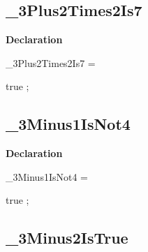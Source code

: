 \documentclass{report}
\newif\ifpdf
\begin{document}
\subsection*{{\_}3Plus2Times2Is7}
\fi
\label{ok_if_expressions_2-_3Plus2Times2Is7}
\begin{list}{}{
\setlength{\itemindent}{0cm}
\setlength{\listparindent}{0cm}
\setlength{\leftmargin}{\evensidemargin}
\addtolength{\leftmargin}{\tmplength}
\settowidth{\labelsep}{X}
\addtolength{\leftmargin}{\labelsep}
\setlength{\labelwidth}{\tmplength}
}
\item[\textbf{Declaration}\hfill]
\ifpdf
\begin{flushleft}
\fi
\begin{ttfamily}
{\_}3Plus2Times2Is7 =

true
;\end{ttfamily}

\ifpdf
\end{flushleft}
\fi

\end{list}
\ifpdf
\subsection*{\large{\textbf{{\_}3Minus1IsNot4}}\normalsize\hspace{1ex}\hrulefill}
\else
\subsection*{{\_}3Minus1IsNot4}
\fi
\label{ok_if_expressions_2-_3Minus1IsNot4}
\begin{list}{}{
\setlength{\itemindent}{0cm}
\setlength{\listparindent}{0cm}
\setlength{\leftmargin}{\evensidemargin}
\addtolength{\leftmargin}{\tmplength}
\settowidth{\labelsep}{X}
\addtolength{\leftmargin}{\labelsep}
\setlength{\labelwidth}{\tmplength}
}
\item[\textbf{Declaration}\hfill]
\ifpdf
\begin{flushleft}
\fi
\begin{ttfamily}
{\_}3Minus1IsNot4 =

true
;\end{ttfamily}

\ifpdf
\end{flushleft}
\fi

\end{list}
\ifpdf
\subsection*{\large{\textbf{{\_}3Minus2IsTrue}}\normalsize\hspace{1ex}\hrulefill}
\else
\end{document}
